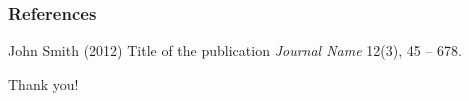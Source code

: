\documentclass[12pt]{beamer}
\numberwithin{thm}{section}
\numberwithin{defn}{section}
\numberwithin{lmm}{section}
\theoremstyle{example}
\numberwithin{figure}{section}
\numberwithin{table}{section}
\numberwithin{equation}{section}
\begin{document}

\begin{frame}
\frametitle{References}
\footnotesize{
\begin{thebibliography}{99} %
 John Smith (2012)
\newblock Title of the publication
\newblock \emph{Journal Name} 12(3), 45 -- 678.
\end{thebibliography}
}
\end{frame}



\begin{frame}[standout]
  \Huge Thank you!
\end{frame}
\end{document}

